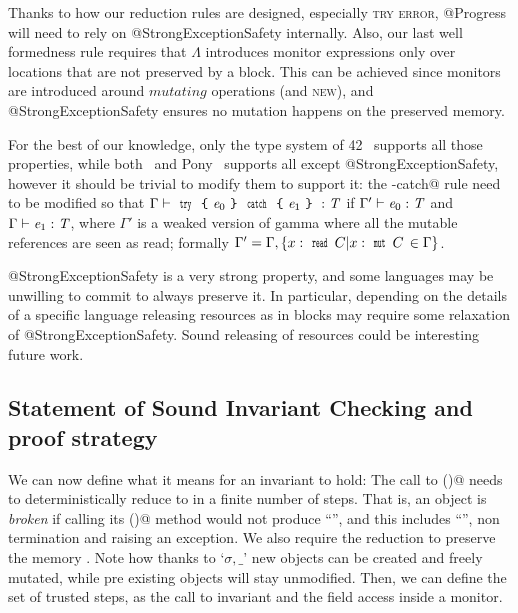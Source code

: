 Thanks to how our reduction rules are designed, especially \textsc{try error},
@Progress will need to rely on @StrongExceptionSafety internally.
Also, our last well formedness rule requires that $\Lambda$ introduces
monitor expressions only over locations that are not preserved by a \Q@try@ block.
This can be achieved since monitors are introduced around $\mathit{mutating}$ operations (and \textsc{new}),
and @StrongExceptionSafety ensures no mutation happens on the preserved memory.

For the best of our knowledge, only the type system of 42~\cite{ServettoEtAl13a,ServettoZucca15}
 supports all those properties,
while both~\cite{GordonEtAl12} and Pony~\cite{clebsch2015deny} supports all except @StrongExceptionSafety,
however it should be trivial to modify them to support it:
the \Q@try-catch@ rule need to be modified so that
$\Gamma\vdash\Kw{try}\oC\e_0\cC\Kw{catch}\oC\e_1\cC:\T$
if $\Gamma'\vdash\e_0:\T$ and $\Gamma\vdash\e_1:\T$,
where $\Gamma'$ is a weaked version of gamma where all the mutable
references are seen as read; formally $\Gamma'=\Gamma,\{x:\Kw{read}\,C | x:\Kw{mut}\,C\,\in\Gamma\}$.


@StrongExceptionSafety is 
a very strong property,
and some languages may be unwilling to commit to always preserve it.
In particular, depending on the details of a specific language
 releasing resources as in \Q@finally@ blocks may require
some relaxation of @StrongExceptionSafety. Sound releasing of resources could be interesting
future work.

\subsection{Statement of Sound Invariant Checking and proof strategy}

\noindent We can now define what it means for an invariant to hold:
The call to \Q@invariant()@ needs to deterministically reduce to \Q@true@ in a finite number
of steps. 
That is, an object is \emph{broken} if calling its \Q@invariant()@
method would not produce ``\Q@true@'', and this includes ``\Q@false@'', non termination and raising an exception.
We also require the reduction to preserve the memory \Q@sigma@.
Note how thanks to `$\sigma,\_ $' new objects can be created and freely mutated, while 
pre existing objects will stay unmodified.
Then, we can define the set of trusted steps, 
as the call to invariant and the field access inside a monitor.

